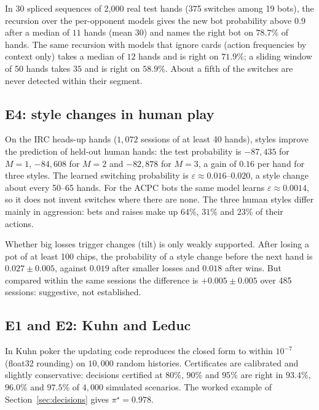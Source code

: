 \documentclass[11pt,a4paper]{article}
\newcommand{\1}{\mathbf{1}}
\begin{document}
In 30 spliced sequences of 2{,}000 real test hands (375 switches among 19
bots), the recursion over the per-opponent models gives the new bot probability
above $0.9$ after a median of $11$ hands (mean $30$) and names the right bot on
$78.7\%$ of hands. The same recursion with models that ignore cards (action
frequencies by context only) takes a median of $12$ hands and is right on
$71.9\%$; a sliding window of 50 hands takes $35$ and is right on $58.9\%$.
About a fifth of the switches are never detected within their segment.

\subsection{E4: style changes in human play}

On the IRC heads-up hands ($1{,}072$ sessions of at least 40 hands), styles
improve the prediction of held-out human hands: the test probability is
$-87{,}435$ for $M=1$, $-84{,}608$ for $M=2$ and $-82{,}878$ for $M=3$, a gain of
$0.16$ per hand for three styles. The learned switching probability is
$\varepsilon\approx0.016$--$0.020$, a style change about every 50--65 hands. For
the ACPC bots the same model learns $\varepsilon\approx0.0014$, so it does not
invent switches where there are none. The three human styles differ mainly in
aggression: bets and raises make up $64\%$, $31\%$ and $23\%$ of their actions.

Whether big losses trigger changes (tilt) is only weakly supported. After
losing a pot of at least 100 chips, the probability of a style change before
the next hand is $0.027\pm0.005$, against $0.019$ after smaller losses and
$0.018$ after wins. But compared within the same sessions the difference is
$+0.005\pm0.005$ over 485 sessions: suggestive, not established.

\subsection{E1 and E2: Kuhn and Leduc}

In Kuhn poker the updating code reproduces the closed form to within $10^{-7}$
(float32 rounding) on $10{,}000$ random histories. Certificates are calibrated
and slightly conservative: decisions certified at $80\%$, $90\%$ and $95\%$ are
right in $93.4\%$, $96.0\%$ and $97.5\%$ of $4{,}000$ simulated scenarios. The
worked example of Section~\ref{sec:decisions} gives $\pi^\star=0.978$.
\end{document}
